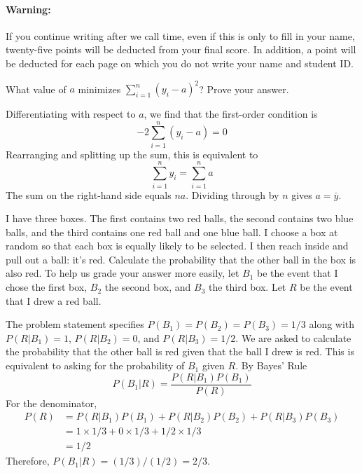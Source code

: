 \documentclass[addpoints,12pt]{exam}
\begin{document}
\paragraph{Warning:} If you continue writing after we call time, even if this is only to fill in your name, twenty-five points will be deducted from your final score. In addition, a point will be deducted for each page on which you do not write your name and student ID. 

\newpage
\begin{questions}

  \question[20] What value of $a$ minimizes $\sum_{i=1}^n (y_i - a)^2$? Prove your answer.
  \begin{solution}[3.25in]
    Differentiating with respect to $a$, we find that the first-order condition is 
    \[-2\sum_{i=1}^n (y_i-a) = 0\]
    Rearranging and splitting up the sum, this is equivalent to
    \[\sum_{i=1}^n y_i = \sum_{i=1}^n a\]
    The sum on the right-hand side equals $n a$.
    Dividing through by $n$ gives $a = \bar{y}$.
\end{solution}

\question[20] I have three boxes. The first contains two red balls, the second contains two blue balls, and the third contains one red ball and one blue ball.
I choose a box at random so that each box is equally likely to be selected.
I then reach inside and pull out a ball: it's red.
Calculate the probability that the other ball in the box is also red.
To help us grade your answer more easily, let $B_1$ be the event that I chose the first box, $B_2$ the second box, and $B_3$ the third box.
Let $R$ be the event that I drew a red ball.
\begin{solution}[3.5in]
  The problem statement specifies $P(B_1) = P(B_2) = P(B_3) = 1/3$ along with $P(R|B_1) = 1$, $P(R|B_2) = 0$, and $P(R|B_3) = 1/2$.
  We are asked to calculate the probability that the other ball is red given that the ball I drew is red.
  This is equivalent to asking for the probability of $B_1$ given $R$.
  By Bayes' Rule
  \[P(B_1|R) = \frac{P(R|B_1)P(B_1)}{P(R)}\]
  For the denominator,
  \begin{align*}
    P(R) &= P(R|B_1)P(B_1) + P(R|B_2) P(B_2) + P(R|B_3) P(B_3) \\ 
    &= 1 \times 1/3 + 0 \times 1/3 + 1/2 \times 1/3\\
    &= 1/2 
  \end{align*}
  Therefore, $P(B_1|R) = (1/3) / (1/2) = 2/3$.
\end{solution}


\end{questions}
\end{document}
